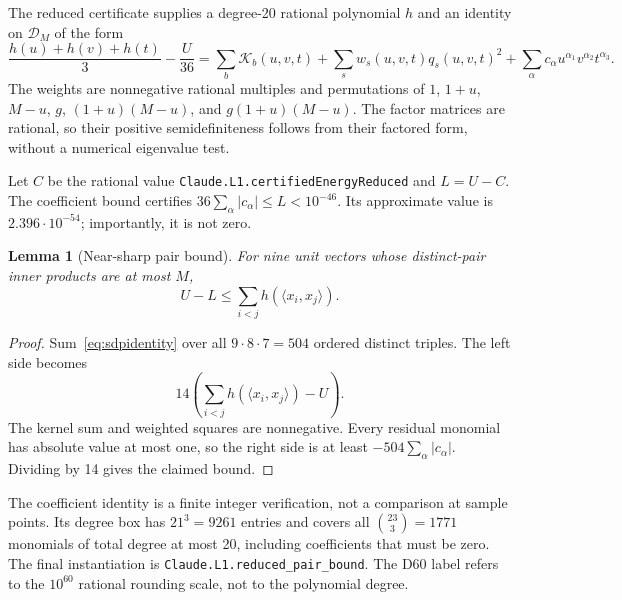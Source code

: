 \documentclass[11pt]{article}
\newtheorem{lemma}[theorem]{Lemma}
\theoremstyle{remark}
\newcommand{\ip}[2]{\langle #1,#2\rangle}
\newcommand{\code}[1]{{\small\nolinkurl{#1}}}
\begin{document}
The reduced certificate supplies a degree-20 rational polynomial $h$ and an
identity on $\mathcal D_M$ of the form
\begin{equation}\label{eq:sdpidentity}
 \frac{h(u)+h(v)+h(t)}3-\frac U{36}
 =\sum_b\mathcal K_b(u,v,t)+\sum_s w_s(u,v,t)q_s(u,v,t)^2
        +\sum_\alpha c_\alpha u^{\alpha_1}v^{\alpha_2}t^{\alpha_3}.
\end{equation}
The weights are nonnegative rational multiples and permutations of
$1$, $1+u$, $M-u$, $g$, $(1+u)(M-u)$, and $g(1+u)(M-u)$.
The factor matrices are rational, so their positive semidefiniteness follows
from their factored form, without a numerical eigenvalue test.

Let $C$ be the rational value \code{Claude.L1.certifiedEnergyReduced} and
$L=U-C$. The coefficient bound certifies
$36\sum_\alpha|c_\alpha|\le L<10^{-46}$. Its approximate value is
$2.396\cdot10^{-54}$; importantly, it is not zero.

\begin{lemma}[Near-sharp pair bound]\label{lem:pairbound}
For nine unit vectors whose distinct-pair inner products are at most $M$,
\[
 U-L\le\sum_{i<j}h(\ip{x_i}{x_j}).
\]
\end{lemma}
\begin{proof}
Sum~\eqref{eq:sdpidentity} over all $9\cdot8\cdot7=504$ ordered distinct
triples. The left side becomes
\[
 14\left(\sum_{i<j}h(\ip{x_i}{x_j})-U\right).
\]
The kernel sum and weighted squares are nonnegative. Every residual monomial
has absolute value at most one, so the right side is at least
$-504\sum_\alpha|c_\alpha|$. Dividing by 14 gives the claimed bound.
\end{proof}

The coefficient identity is a finite integer verification, not a comparison
at sample points. Its degree box has $21^3=9261$ entries and covers all
$\binom{23}{3}=1771$ monomials of total degree at most 20, including coefficients
that must be zero. The final instantiation is
\code{Claude.L1.reduced_pair_bound}. The D60 label refers to the $10^{60}$
rational rounding scale, not to the polynomial degree.
\end{document}
